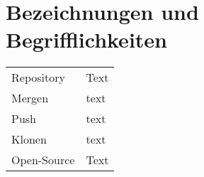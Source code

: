 \chapter*{Bezeichnungen und Begrifflichkeiten}

\begin{tabular}{ll}
Repository  & Text \\
Mergen & text \\
Push & text \\
Klonen & text \\
Open-Source & Text \\

\end{tabular}